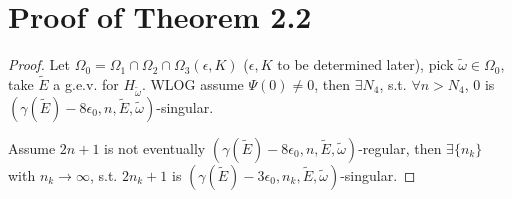 \section{Proof of Theorem 2.2}
\begin{proof}
Let $\Omega_0=\Omega_1\cap\Omega_2\cap\Omega_3(\epsilon,K)$  ($\epsilon,K$ to be determined later), pick $\tilde{\omega}\in\Omega_0$, take $\tilde{E}$ a g.e.v. for $H_{\tilde{\omega}}$.
WLOG assume $\Psi(0)\neq 0$, then $\exists N_4$, s.t. $\forall n>N_4$, 0 is $(\gamma(\tilde{E})-8\epsilon_0,n,\tilde{E},\tilde{\omega})$-singular.

Assume $2n+1$ is not eventually $(\gamma(\tilde{E})-8\epsilon_0,n,\tilde{E},\tilde{\omega})$-regular, then $\exists \{n_k\}$ with $n_k\to\infty$, s.t. $2n_k+1$ is  $(\gamma(\tilde{E})-3\epsilon_0,n_k,\tilde{E},\tilde{\omega})$-singular.


\end{proof}
